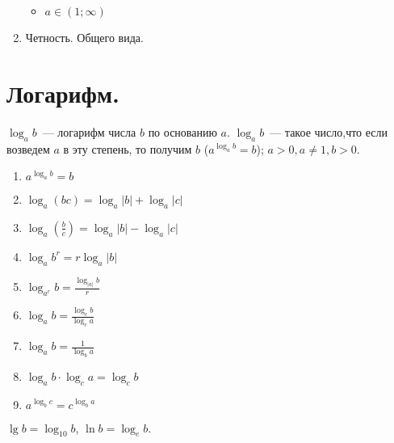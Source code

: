 \documentclass{article}
\begin{document}
\begin{property}
\begin{enumerate}
\begin{itemize}
\begin{figure}[H]
				\end{figure}
				\item $a \in (1; \infty)$
				\begin{figure}[H]
				\end{figure}
			\end{itemize}
			\item Четность. Общего вида.
		\end{enumerate}
	\end{property}
	\section{Логарифм.}
	\begin{definition}
		$\log_ab$~--- логарифм числа $b$ по основанию $a$. $\log_ab$~--- такое число,что если возведем $a$ в эту степень, то получим $b$ ($a^{\log_ab} = b$); $a > 0, a\not=1, b > 0$.
	\end{definition}
	\begin{property}
		\begin{enumerate}
			\item $a^{\log_ab} = b$
			\item $\log_a(bc) = \log_a|b| + \log_a|c|$
			\item $\log_a(\frac{b}{c}) = \log_a|b| - \log_a|c|$
			\item $\log_ab^r = r\log_a|b|$
			\item $\log_{a^r}b = \frac{\log_{|a|}b}{r}$
			\item $\log_ab = \frac{\log_cb}{\log_ca}$
			\item $\log_ab = \frac{1}{\log_ba}$
			\item $\log_ab \cdot \log_ca = \log_cb$
			\item $a^{\log_bc} = c^{\log_ba}$
		\end{enumerate}
	\end{property}
	\begin{note}
		$\lg b = \log_{10}b$, $\ln b = \log_{e}b$.
	\end{note}
\end{document}
